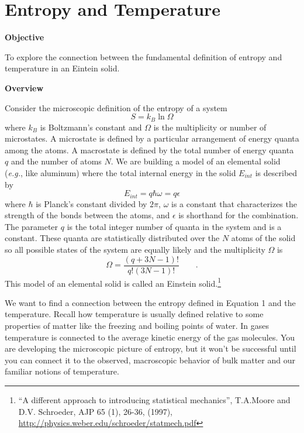 \section{Entropy and Temperature}

\makelabheader %

\textbf{Objective}

To explore the connection between the fundamental definition of entropy and
temperature in an Eintein solid.

\textbf{Overview}

Consider the microscopic  definition of the entropy of a system
\begin{equation}
S = k_B \ln \Omega
\end{equation}
where $k_B$ is Boltzmann's constant and $\Omega$ is the multiplicity or number of 
microstates.
A microstate is defined by a particular arrangement of energy quanta among the
atoms.
A macrostate is defined by the total number of energy quanta $q$ and the number of atoms $N$.
We are building a model of an elemental solid ({\it e.g.}, like aluminum)
where
the total internal energy in the solid $E_{int}$ is described by
\begin{equation}
E_{int} = q \hbar \omega = q\epsilon
\end{equation}
where $\hbar$ is Planck's constant divided by $2\pi$, $\omega$ is a constant that
characterizes the strength of the bonds between the atoms, and
$\epsilon$ is shorthand for the combination.
The parameter $q$ is the total integer number of quanta in the system and is a constant.
These quanta are statistically distributed over the $N$ atoms of the solid so
all possible states of the system are equally likely and the multiplicity $\Omega$
is
\begin{equation}
\Omega = \frac{(q+3N-1)!}{q!(3N-1)!} \qquad .
\end{equation}
This model of an elemental solid is called an Einstein solid.\footnote{``A different approach to introducing statistical mechanics'', T.A.Moore and D.V. Schroeder,
AJP 65 (1), 26-36, (1997), 
\url{http://physics.weber.edu/schroeder/statmech.pdf}} %

We want to find a connection between the entropy defined in Equation 1 and the
temperature.
Recall how temperature is usually defined
relative to some properties of matter like the freezing and 
boiling points of water.
In gases temperature is connected to the average kinetic energy of the gas molecules.
You are developing the microscopic picture of entropy, but it won't be successful until
you can connect it to the observed, macroscopic behavior of bulk matter and our familiar notions of 
temperature.

